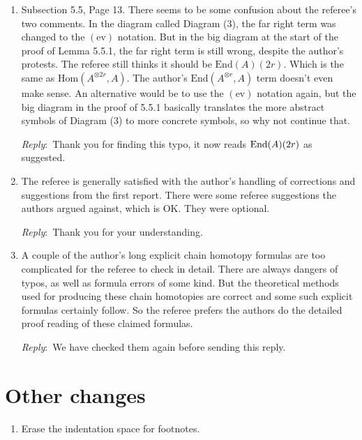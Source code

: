 \documentclass{amsart}
\newcommand{\ar}{\medskip\noindent\textit{Reply}:\ }
\begin{document}
\begin{enumerate}
	\ar We added the reference in the proof. Thank you for the suggestion.

	\item Subsection 5.5, Page 13. There seems to be some confusion about the referee's two comments. In the diagram called Diagram (3), the far right term was changed to the $(\text{ev})$ notation. But in the big diagram at the start of the proof of Lemma 5.5.1, the far right term is still wrong, despite the author's protests. The referee still thinks it should be $\text{End}(A)(2r)$. Which is the same as $\text{Hom}(A^{\otimes 2r}, A)$. The author's $\text{End}(A^{\otimes r}, A)$ term doesn’t even make sense. An alternative would be to use the $(\text{ev})$ notation again, but the big diagram in the proof of 5.5.1 basically translates the more abstract symbols of Diagram (3) to more concrete symbols, so why not continue that.

	\ar Thank you for finding this typo, it now reads $\mathrm{End}(A)(2r)$ as suggested.

	\item The referee is generally satisfied with the author's handling of corrections and suggestions from the first report. There were some referee suggestions the authors argued against, which is OK. They were optional.

	\ar Thank you for your understanding.

	\item A couple of the author's long explicit chain homotopy formulas are too complicated for the referee to check in detail. There are always dangers of typos, as well as formula errors of some kind. But the theoretical methods used for producing these chain homotopies are correct and some such explicit formulas certainly follow. So the referee prefers the authors do the detailed proof reading of these claimed formulas.

	\ar We have checked them again before sending this reply.
\end{enumerate}

\section{Other changes}

\begin{enumerate}
	\item Erase the indentation space for footnotes.
\end{enumerate}
\end{document}
